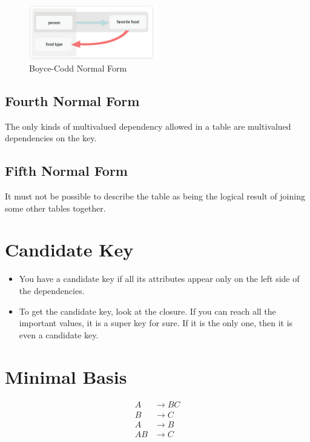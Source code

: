 \documentclass{article}
\begin{document}
\begin{figure}[h]
    \centering
    \includegraphics[width=0.5\textwidth]{assets/b_normal_form.png}
    \caption{Boyce-Codd Normal Form}
\end{figure}

\subsection{Fourth Normal Form}
The only kinds of multivalued dependency allowed in a table are multivalued
dependencies on the key.

\subsection{Fifth Normal Form}
It must not be possible to describe the table as being the logical result of
joining some other tables together.

\section{Candidate Key}
\begin{itemize}
    \item You have a candidate key if all its attributes appear only on the left side of
          the dependencies.
    \item To get the candidate key, look at the closure. If you can reach all the
          important values, it is a super key for sure. If it is the only one, then it is
          even a candidate key.
\end{itemize}

\section{Minimal Basis}
\begin{align*}
    A &\rightarrow BC \\
    B &\rightarrow C \\
    A &\rightarrow B \\
    AB &\rightarrow C \\
\end{align*}
\end{document}
